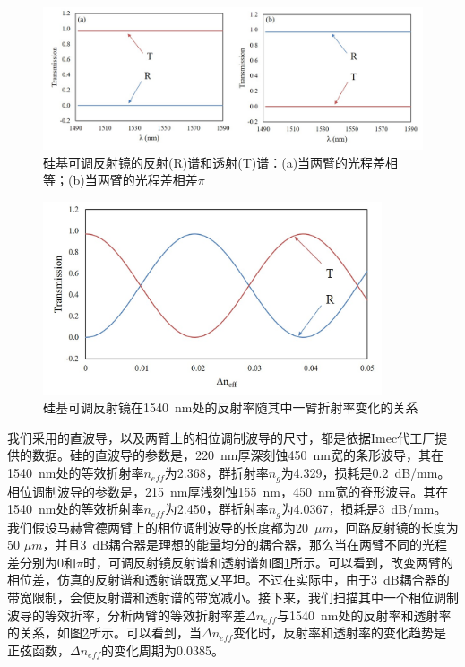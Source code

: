 \begin{figure}[htb]
	\centering
	\includegraphics[width=16cm]{./Pictures/chapt5_tunable_reflection_mirror_spec.jpg}
	\caption{硅基可调反射镜的反射(R)谱和透射(T)谱：(a)当两臂的光程差相等；(b)当两臂的光程差相差$\pi$}
	\label{chapt5_tunable_reflection_mirror_spec}
\end{figure}
\begin{figure}[htb]
	\centering
	\includegraphics[width=10cm]{./Pictures/chapt5_tunable_reflection_mirror_spec_single.jpg}
	\caption{硅基可调反射镜在1540~nm处的反射率随其中一臂折射率变化的关系}
	\label{chapt5_tunable_reflection_mirror_spec_single}
\end{figure}

我们采用的直波导，以及两臂上的相位调制波导的尺寸，都是依据Imec代工厂提供的数据\cite{Imec}。硅的直波导的参数是，220~nm厚深刻蚀450~nm宽的条形波导，其在1540~nm处的等效折射率$n_{eff}$为2.368，群折射率$n_{g}$为4.329，损耗是0.2~dB/mm。相位调制波导的参数是，215~nm厚浅刻蚀155~nm，450~nm宽的脊形波导。其在1540~nm处的等效折射率$n_{eff}$为2.450，群折射率$n_{g}$为4.0367，损耗是3~dB/mm。我们假设马赫曾德两臂上的相位调制波导的长度都为20~$\mu m$，回路反射镜的长度为50 $\mu m$，并且3~dB耦合器是理想的能量均分的耦合器，那么当在两臂不同的光程差分别为0和$\pi$时，可调反射镜反射谱和透射谱如图\ref{chapt5_tunable_reflection_mirror_spec}所示。可以看到，改变两臂的相位差，仿真的反射谱和透射谱既宽又平坦。不过在实际中，由于3~dB耦合器的带宽限制，会使反射谱和透射谱的带宽减小。接下来，我们扫描其中一个相位调制波导的等效折率，分析两臂的等效折射率差$\Delta n_{eff}$与1540~nm处的反射率和透射率的关系，如图\ref{chapt5_tunable_reflection_mirror_spec_single}所示。可以看到，当$\Delta n_{eff}$变化时，反射率和透射率的变化趋势是正弦函数，$\Delta n_{eff}$的变化周期为0.0385。

